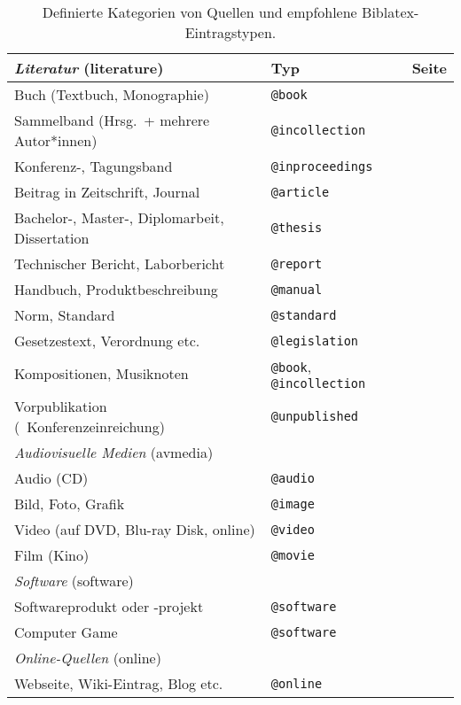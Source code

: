 \begin{table}
\caption{Definierte Kategorien von Quellen und empfohlene Biblatex-Eintragstypen.}
\label{tab:QuellenUndEintragstypen}
\centering
\begin{tabular}{@{}llc@{}}
	\toprule
	\emph{Literatur} (\textsf{literature}) & Typ & Seite\\
	\midrule
	Buch (Textbuch, Monographie) & \texttt{@book} & \pageref{sec:@book}\\
	Sammelband (Hrsg.\ + mehrere Autor*innen) & \texttt{@incollection} & \pageref{sec:@incollection} \\
	Konferenz-, Tagungsband & \texttt{@inproceedings} & \pageref{sec:@inproceedings}\\
	Beitrag in Zeitschrift, Journal & \texttt{@article} & \pageref{sec:@article}\\
	Bachelor-, Master-, Diplomarbeit, Dissertation & \texttt{@thesis} & \pageref{sec:@thesis}\\
	Technischer Bericht, Laborbericht & \texttt{@report} & \pageref{sec:@report}\\
	Handbuch, Produktbeschreibung & \texttt{@manual} & \pageref{sec:@manual}\\
	Norm, Standard & \texttt{@standard} & \pageref{sec:@standard}\\
	Gesetzestext, Verordnung etc. & \texttt{@legislation} & \pageref{sec:@legislation}\\
	Kompositionen, Musiknoten & \texttt{@book}, \texttt{@incollection} & \pageref{sec:Musiknoten}\\
	Vorpublikation (\zB\ Konferenzeinreichung) & \texttt{@unpublished} & \pageref{sec:@unpublished}\\
	\addlinespace
%
	\midrule
	\emph{Audiovisuelle Medien} (\textsf{avmedia}) & & \\
	\midrule
	Audio (CD) & \texttt{@audio} & \pageref{sec:@audio}\\
	Bild, Foto, Grafik & \texttt{@image} & \pageref{sec:@image}\\
	Video (auf DVD, Blu-ray Disk, online) & \texttt{@video} & \pageref{sec:@video}\\
	Film (Kino) & \texttt{@movie} & \pageref{sec:@movie}\\
	\addlinespace
%
	\midrule
	\emph{Software} (\textsf{software}) & & \\
	\midrule
	Softwareprodukt oder -projekt & \texttt{@software} & \pageref{sec:@software}\\
	Computer Game & \texttt{@software} & \pageref{sec:@software}\\
	\addlinespace
%
	\midrule
	\emph{Online-Quellen} (\textsf{online}) & & \\
	\midrule
	Webseite, Wiki-Eintrag, Blog etc. & \texttt{@online} & \pageref{sec:@online-www} \\
	\bottomrule
\end{tabular}
\end{table}

